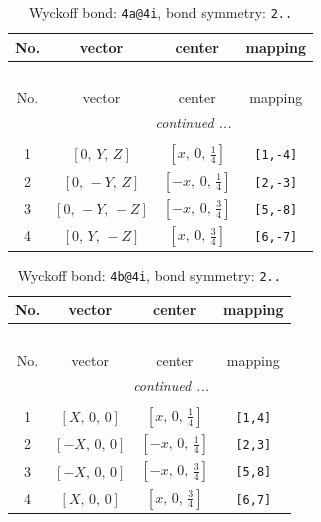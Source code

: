 \documentclass[fleqn,8pt]{jsarticle}
\begin{document}
\begin{longtable}{cccc}
\caption{Wyckoff bond: {\tt 4a@4i}, bond symmetry: {\tt 2..}}
 \\
 \hline \hline
No. & vector & center & mapping \\ \hline \endfirsthead

\multicolumn{3}{l}{\tablename\ \thetable{}} \\
 \hline \hline
No. & vector & center & mapping \\ \hline \endhead

 \hline \hline
\multicolumn{3}{r}{\footnotesize\it continued ...} \\ \endfoot

 \hline \hline
\multicolumn{3}{r}{} \\ \endlastfoot

1 & $\left[ 0,\, Y,\, Z \right]$ & $\left[ x,\, 0,\, \frac{1}{4} \right]$ & {\tt [1,-4]} \\ \hline
2 & $\left[ 0,\, - Y,\, Z \right]$ & $\left[ - x,\, 0,\, \frac{1}{4} \right]$ & {\tt [2,-3]} \\ \hline
3 & $\left[ 0,\, - Y,\, - Z \right]$ & $\left[ - x,\, 0,\, \frac{3}{4} \right]$ & {\tt [5,-8]} \\ \hline
4 & $\left[ 0,\, Y,\, - Z \right]$ & $\left[ x,\, 0,\, \frac{3}{4} \right]$ & {\tt [6,-7]} \\
\end{longtable}
\renewcommand{\arraystretch}{1.2}
\begin{longtable}{cccc}
\caption{Wyckoff bond: {\tt 4b@4i}, bond symmetry: {\tt 2..}}
 \\
 \hline \hline
No. & vector & center & mapping \\ \hline \endfirsthead

\multicolumn{3}{l}{\tablename\ \thetable{}} \\
 \hline \hline
No. & vector & center & mapping \\ \hline \endhead

 \hline \hline
\multicolumn{3}{r}{\footnotesize\it continued ...} \\ \endfoot

 \hline \hline
\multicolumn{3}{r}{} \\ \endlastfoot

1 & $\left[ X,\, 0,\, 0 \right]$ & $\left[ x,\, 0,\, \frac{1}{4} \right]$ & {\tt [1,4]} \\ \hline
2 & $\left[ - X,\, 0,\, 0 \right]$ & $\left[ - x,\, 0,\, \frac{1}{4} \right]$ & {\tt [2,3]} \\ \hline
3 & $\left[ - X,\, 0,\, 0 \right]$ & $\left[ - x,\, 0,\, \frac{3}{4} \right]$ & {\tt [5,8]} \\ \hline
4 & $\left[ X,\, 0,\, 0 \right]$ & $\left[ x,\, 0,\, \frac{3}{4} \right]$ & {\tt [6,7]} \\
\end{longtable}
\end{document}
